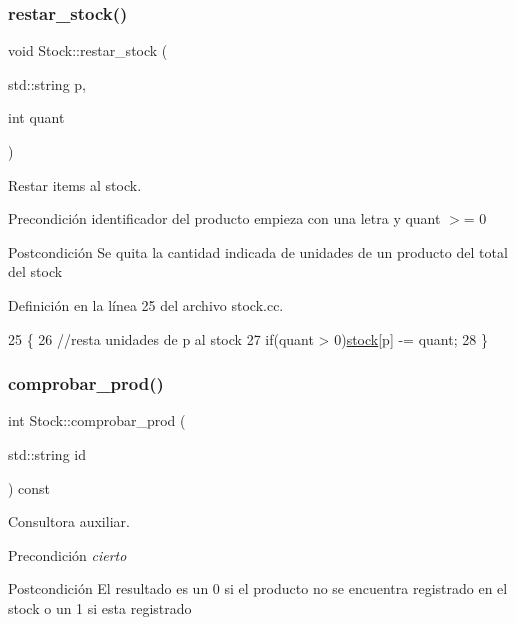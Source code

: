 \subsubsection{\texorpdfstring{restar\+\_\+stock()}{restar\_stock()}}
{\footnotesize\ttfamily void Stock\+::restar\+\_\+stock (\begin{DoxyParamCaption}\item[{std\+::string}]{p,  }\item[{int}]{quant }\end{DoxyParamCaption})}



Restar items al stock. 

\begin{DoxyPrecond}{Precondición}
identificador del producto empieza con una letra y quant $>$= 0 
\end{DoxyPrecond}
\begin{DoxyPostcond}{Postcondición}
Se quita la cantidad indicada de unidades de un producto del total del stock 
\end{DoxyPostcond}


Definición en la línea 25 del archivo stock.\+cc.


\begin{DoxyCode}
25                                             \{
26     \textcolor{comment}{//resta unidades de p al stock}
27     \textcolor{keywordflow}{if}(quant > 0)\mbox{\hyperlink{class_stock_a55cb69748a14da5fe525e55a2c656ba9}{stock}}[p] -= quant;
28 \}
\end{DoxyCode}
\mbox{\label{class_stock_ae1fe35478f2eeae0f91216e7c25e33e6}} 
\subsubsection{\texorpdfstring{comprobar\+\_\+prod()}{comprobar\_prod()}}
{\footnotesize\ttfamily int Stock\+::comprobar\+\_\+prod (\begin{DoxyParamCaption}\item[{std\+::string}]{id }\end{DoxyParamCaption}) const}



Consultora auxiliar. 

\begin{DoxyPrecond}{Precondición}
{\itshape cierto} 
\end{DoxyPrecond}
\begin{DoxyPostcond}{Postcondición}
El resultado es un 0 si el producto no se encuentra registrado en el stock o un 1 si esta registrado 
\end{DoxyPostcond}



